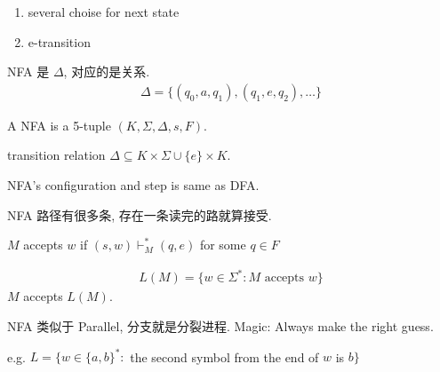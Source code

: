 \begin{enumerate}
    \item several choise for next state 
    \item e-transition
\end{enumerate}
NFA 是 $\Delta$, 对应的是关系. 
\begin{align*}
    \Delta=\{ (q_0, a, q_1), (q_1,e,q_2), \dots \}
\end{align*}

\begin{definition}
    A NFA is a 5-tuple $(K,\Sigma, \Delta, s, F)$. 

    transition relation $\Delta\subseteq K\times \Sigma \cup \{ e \}\times K$.  
\end{definition}

NFA's configuration and step is same as DFA. 

NFA 路径有很多条, 存在一条读完的路就算接受. 

\begin{definition}
    $M$ accepts $w$ if $(s,w)\vdash_M^* (q,e)$ for some $q\in F$
\end{definition}

\begin{definition}
    \begin{align*}
        L(M)=\{ w\in\Sigma^*: M\text{ accepts }w \}
    \end{align*}
    $M$ accepts $L(M)$.
\end{definition}

NFA 类似于 Parallel, 分支就是分裂进程. Magic: Always make the right guess.

e.g. $L=\{ w\in \{a,b \}^*:$ the second symbol from the end of $w$ is $b \}$


